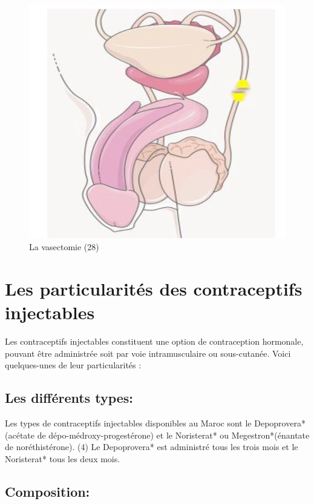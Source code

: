 \begin{figure}[H]
  \centering
  \includegraphics{Images/fig_44.jpg}
  \caption{La vasectomie (28)}
  
\end{figure}

\section{Les particularités des contraceptifs injectables }

\noindent Les contraceptifs injectables constituent une option de contraception hormonale, pouvant être administrée soit par voie intramusculaire ou sous-cutanée. Voici quelques-unes de leur particularités :  


\subsection{Les différents types: }

Les types de contraceptifs injectables disponibles au Maroc sont le Depoprovera* (acétate de dépo-médroxy-progestérone) et le Noristerat* ou Megestron*(énantate de noréthistérone). (4) Le Depoprovera* est administré tous les trois mois et le Noristerat* tous les deux mois. 

\subsection{Composition: }

